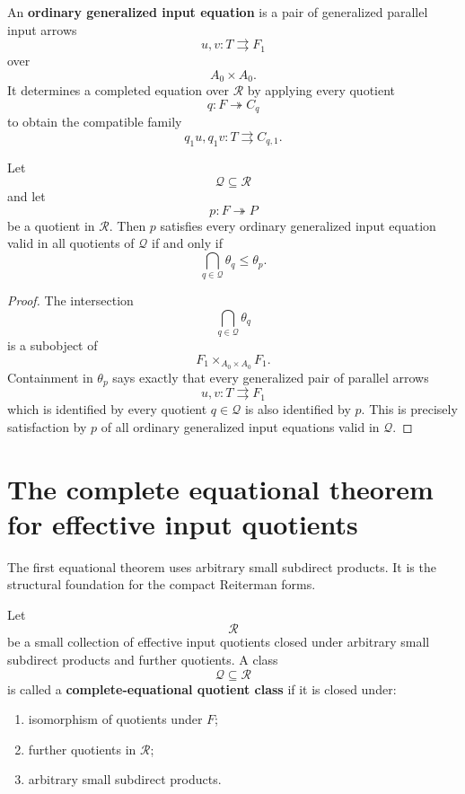 \begin{definition}
\label{def:eilenberg-ordinary-generalized-input-equation}
An \textbf{ordinary generalized input equation} is a pair of generalized
parallel input arrows
\[
u,v:T\rightrightarrows F_1
\]
over
\[
A_0\times A_0.
\]
It determines a completed equation over \(\mathcal R\) by applying every
quotient
\[
q:F\twoheadrightarrow C_q
\]
to obtain the compatible family
\[
q_1u,q_1v:T\rightrightarrows C_{q,1}.
\]
\end{definition}

\begin{lemma}
\label{lem:eilenberg-ordinary-equations-detect-containment}
Let
\[
\mathcal Q\subseteq\mathcal R
\]
and let
\[
p:F\twoheadrightarrow P
\]
be a quotient in \(\mathcal R\). Then \(p\) satisfies every ordinary
generalized input equation valid in all quotients of \(\mathcal Q\) if and
only if
\[
\bigcap_{q\in\mathcal Q}\theta_q
\leq
\theta_p.
\]
\end{lemma}

\begin{proof}
The intersection
\[
\bigcap_{q\in\mathcal Q}\theta_q
\]
is a subobject of
\[
F_1\times_{A_0\times A_0}F_1.
\]
Containment in \(\theta_p\) says exactly that every generalized pair of
parallel arrows
\[
u,v:T\rightrightarrows F_1
\]
which is identified by every quotient \(q\in\mathcal Q\) is also identified
by \(p\). This is precisely satisfaction by \(p\) of all ordinary generalized
input equations valid in \(\mathcal Q\).
\end{proof}

\section{The complete equational theorem for effective input quotients}
\label{sec:eilenberg-complete-equational-theorem}

The first equational theorem uses arbitrary small subdirect products. It is
the structural foundation for the compact Reiterman forms.

\begin{definition}
\label{def:eilenberg-complete-equational-quotient-class}
Let
\[
\mathcal R
\]
be a small collection of effective input quotients closed under arbitrary
small subdirect products and further quotients. A class
\[
\mathcal Q\subseteq\mathcal R
\]
is called a \textbf{complete-equational quotient class} if it is closed under:
\begin{enumerate}
\item isomorphism of quotients under \(F\);
\item further quotients in \(\mathcal R\);
\item arbitrary small subdirect products.
\end{enumerate}
\end{definition}

